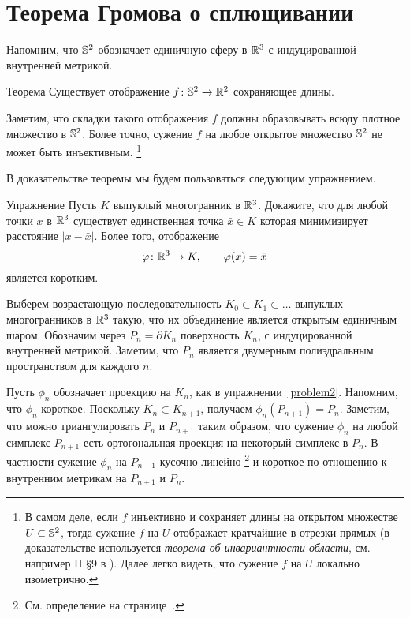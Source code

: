 \section{Теорема Громова о сплющивании}\label{sec:S^2->R^2}

Напомним, что $\mathbb{S}^2$ обозначает единичную сферу в $\mathbb{R}^3$
с индуцированной внутренней метрикой.  

\begin{thm}{Теорема}\label{thm:S2->R2}
Существует отображение $f\colon\mathbb{S}^2\to\mathbb{R}^2$ сохраняющее длины.
\end{thm}

Заметим, что складки такого отображения $f$ 
должны образовывать всюду плотное множество в $\mathbb{S}^2$.
Более точно,  
сужение $f$ на любое открытое множество $\mathbb{S}^2$ не может быть инъективным.%
\footnote{В самом деле, если $f$ инъективно и сохраняет длины на открытом множестве $U \z\subset \SS^2$, 
тогда сужение $f$ на $U$ 
отображает кратчайшие в отрезки прямых (в доказательстве используется \emph{теорема об инвариантности области}, см. например II \S9 в \cite{alexandrov}). 
Далее легко видеть, что сужение $f$ на $U$ 
локально изометрично.}

В доказательстве теоремы мы будем пользоваться следующим упражнением.

\begin{thm}{Упражнение}\label{problem2}
Пусть $K$ выпуклый многогранник в $\mathbb{R}^3$.
Докажите, что для любой точки $x$ в $\mathbb{R}^3$ существует единственная точка $\bar x\in K$ которая минимизирует расстояние $|x-\bar x|$.
Более того,
отображение 
$$\varphi\colon \mathbb{R}^3 \to K, \qquad \varphi(x) = \bar x$$ 
является коротким. 
\end{thm}

Выберем возрастающую последовательность
$K_0\subset K_1\subset \dots$ выпуклых многогранников в $\mathbb{R}^3$ 
такую, что их объединение является открытым единичным шаром.
Обозначим через $P_n = \partial K_n$ поверхность $K_n$, 
с индуцированной внутренней метрикой.
Заметим, что $P_n$ является двумерным полиэдральным пространством для каждого $n$.

Пусть $\phi_n$ обозначает проекцию на $K_{n}$, 
как в упражнении~\ref{problem2}.
Напомним, что $\phi_n$ короткое. 
Поскольку $K_{n} \subset K_{n+1}$, получаем  $\phi_n(P_{n+1}) = P_{n}$.
Заметим, что можно триангулировать $P_n$ и $P_{n+1}$ 
таким образом, что сужение $\phi_n$ на любой симплекс $P_{n+1}$ 
есть ортогональная проекция на некоторый симплекс в $P_{n}$.
В частности сужение $\phi_n$ на $P_{n+1}$ кусочно линейно%
\footnote{См. определение на странице~\pageref{page:piecewise linear map}.}
и короткое по отношению к внутренним метрикам на $P_{n+1}$ и $P_n$.

